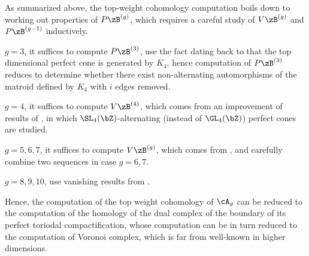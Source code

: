 \documentclass[article, a4paper, twoside]{universal}
\begin{document}

As summarized above, the top-weight cohomology computation boils down to working out properties of $P\zB^{(g)}$, which requires a careful study of $V\zB^{(g)}$ and $P\zB^{(g-1)}$ inductively.

\begin{itm}
	\item $g=3$, it suffices to compute $P\zB^{(3)}$, use the fact dating back to \cite{Voronoi1908} that the top dimensional perfect cone is generated by $K_{4}$, hence computation of $P\zB^{(3)}$ reduces to determine whether there exist non-alternating automorphisms of the matroid defined by $K_{4}$ with $i$ edges removed.
	\item $g=4$, it suffices to compute $V\zB^{(4)}$, which comes from an improvement of results of \cite{LS1978}, in which $\SL_{4}(\bZ)$-alternating (instead of $\GL_{4}(\bZ)$) perfect cones are studied.
	\item $g=5,6,7$, it suffices to compute $V\zB^{(g)}$, which comes from \cite[Theorem~4.3]{EVGS2013}, and carefully combine two sequences in case $g=6,7$.
	\item $g=8,9,10$, use vanishing results from \cite[Theorem~4.5]{SEVKM2019}.
\end{itm}

	Hence, the computation of the top weight cohomology of $\cA_{g}$ can be reduced to the computation of the homology of the dual complex of the boundary of its perfect toriodal compactification, whose computation can be in turn reduced to the computation of Voronoi complex, which is far from well-known in higher dimensions.

\printref
\end{document}
